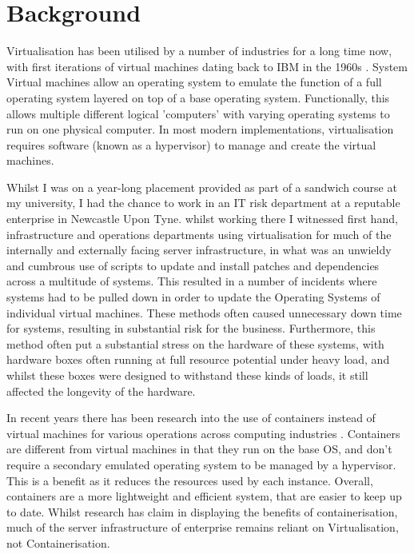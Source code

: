 
\section{Background}
Virtualisation has been utilised by a number of industries for a long time now, with first iterations of virtual machines dating back to IBM in the 1960s \citep{pugh95}. System Virtual machines allow an operating system to emulate the function of a full operating system layered on top of a base operating system. Functionally, this allows multiple different logical 'computers' with varying operating systems to run on one physical computer. In most modern implementations, virtualisation requires software (known as a hypervisor) to manage and create the virtual machines.

Whilst I was on a year-long placement provided as part of a sandwich course at my university, I had the chance to work in an IT risk department at a reputable enterprise in Newcastle Upon Tyne. whilst working there I witnessed first hand, infrastructure and operations departments using virtualisation for much of the internally and externally facing server infrastructure, in what was an unwieldy and cumbrous use of scripts to update and install patches and dependencies across a multitude of systems. This resulted in a number of incidents where systems had to be pulled down in order to update the Operating Systems of individual virtual machines. These methods often caused unnecessary down time for systems, resulting in substantial risk for the business. Furthermore, this method often put a substantial stress on the hardware of these systems, with hardware boxes often running at full resource potential under heavy load, and whilst these boxes were designed to withstand these kinds of loads, it still affected the longevity of the hardware.

In recent years there has been research into the use of containers instead of virtual machines for various operations across computing industries \citep{watanda19}. Containers are different from virtual machines in that they run on the base OS, and don't require a secondary emulated operating system to be managed by a hypervisor. This is a benefit as it reduces the resources \citep{joy15} used by each instance. Overall, containers are a more lightweight and efficient system, that are easier to keep up to date. Whilst research has claim in displaying the benefits of containerisation, much of the server infrastructure of enterprise remains reliant on Virtualisation, not Containerisation.

